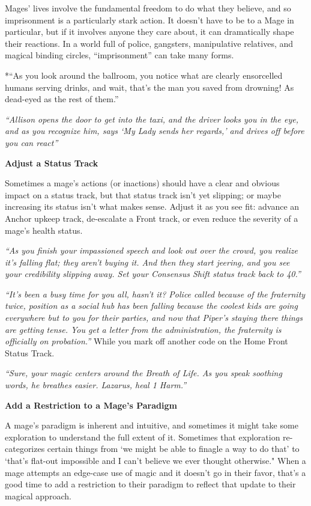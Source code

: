 \documentclass[
  oneside,
  statementpaper,
  9pt]{memoir}
\begin{document}
Mages' lives involve the fundamental freedom to do what they believe,
and so imprisonment is a particularly stark action. It doesn't have to
be to a Mage in particular, but if it involves anyone they care about,
it can dramatically shape their reactions. In a world full of police,
gangsters, manipulative relatives, and magical binding circles,
``imprisonment'' can take many forms.

*``As you look around the ballroom, you notice what are clearly
ensorcelled humans serving drinks, and wait, that's the man you saved
from drowning! As dead-eyed as the rest of them.''

\emph{``Allison opens the door to get into the taxi, and the driver
looks you in the eye, and as you recognize him, says `My Lady sends her
regards,' and drives off before you can react''}

\textbf{Adjust a Status Track}

Sometimes a mage's actions (or inactions) should have a clear and
obvious impact on a status track, but that status track isn't yet
slipping; or maybe increasing its status isn't what makes sense. Adjust
it as you see fit: advance an Anchor upkeep track, de-escalate a Front
track, or even reduce the severity of a mage's health status.

\emph{``As you finish your impassioned speech and look out over the
crowd, you realize it's falling flat; they aren't buying it. And then
they start jeering, and you see your credibility slipping away. Set your
Consensus Shift status track back to 40.''}

\emph{``It's been a busy time for you all, hasn't it? Police called
because of the fraternity twice, position as a social hub has been
falling because the coolest kids are going everywhere but to you for
their parties, and now that Piper's staying there things are getting
tense. You get a letter from the administration, the fraternity is
officially on probation.''} While you mark off another code on the Home
Front Status Track.

\emph{``Sure, your magic centers around the Breath of Life. As you speak
soothing words, he breathes easier. Lazarus, heal 1 Harm.''}

\textbf{Add a Restriction to a Mage's Paradigm}

A mage's paradigm is inherent and intuitive, and sometimes it might take
some exploration to understand the full extent of it. Sometimes that
exploration re-categorizes certain things from `we might be able to
finagle a way to do that' to `that's flat-out impossible and I can't
believe we ever thought otherwise." When a mage attempts an edge-case
use of magic and it doesn't go in their favor, that's a good time to add
a restriction to their paradigm to reflect that update to their magical
approach.
\end{document}

